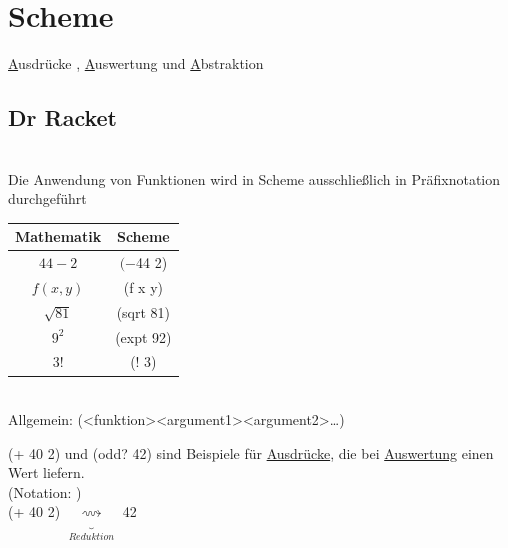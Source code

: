 \section*{Scheme}
\underline{A}usdr\"ucke , \underline{A}uswertung und \underline{A}bstraktion\\
\subsection*{Dr Racket}
\\
Die Anwendung von Funktionen wird in Scheme ausschlie\ss lich in Pr\"afixnotation durchgef\"uhrt
\bigskip\\
\begin{center}
\begin{tabular}{c|c}
Mathematik & Scheme \\
\hline
$44-2$ & $(- $44 2)\\
$f(x,y)$ & (f x y)\\
$\sqrt{81}$ & (sqrt 81)\\
$9^2$ & (expt 92)\\
$3!$ & (! 3)\\
\end{tabular}\\
Allgemein: (\textless funktion\textgreater \textless argument1\textgreater \textless argument2\textgreater \ldots)
\end{center}
(+ 40 2) und (odd? 42) sind Beispiele f\"ur \underline{Ausdr\"ucke}, die bei \underline{Auswertung} einen Wert liefern.\\
(Notation: \eval)\\
(+ 40 2) $\underbrace{\longrightsquigarrow}_{Reduktion}$ 42\\
